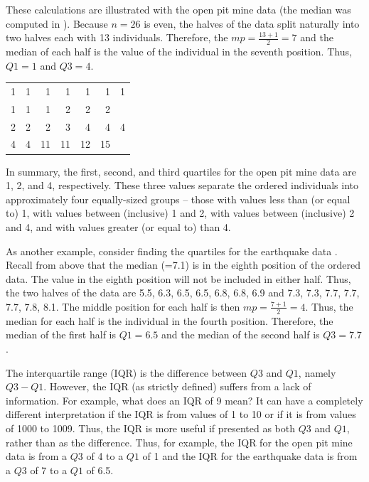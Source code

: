 \documentclass[10pt,openany]{book}\usepackage[]{graphicx}\usepackage[]{color}
\begin{document}
These calculations are illustrated with the open pit mine data (the median was computed in ). Because $n=26$ is even, the halves of the data split naturally into two halves each with 13 individuals. Therefore, the $mp=\frac{13+1}{2}=7$ and the median of each half is the value of the individual in the seventh position. Thus, $Q1=1$ and $Q3=4$.

\begin{tabular}{rrrrrrr}
  1 & 1 & 1 & 1 & 1 & 1 & 1 \\ 
  1 & 1 & 1 & 2 & 2 & 2 &  \\ 
  2 & 2 & 2 & 3 & 4 & 4 & 4 \\ 
  4 & 4 & 11 & 11 & 12 & 15 &  \\ 
  \end{tabular}


In summary, the first, second, and third quartiles for the open pit mine data are 1, 2, and 4, respectively. These three values separate the ordered individuals into approximately four equally-sized groups -- those with values less than (or equal to) 1, with values between (inclusive) 1 and 2, with values between (inclusive) 2 and 4, and with values greater (or equal to) than 4.

As another example, consider finding the quartiles for the earthquake data . Recall from above  that the median (=7.1) is in the eighth position of the ordered data. The value in the eighth position will not be included in either half. Thus, the two halves of the data are 5.5, 6.3, 6.5, 6.5, 6.8, 6.8, 6.9 and 7.3, 7.3, 7.7, 7.7, 7.7, 7.8, 8.1. The middle position for each half is then $mp=\frac{7+1}{2}=4$. Thus, the median for each half is the individual in the fourth position. Therefore, the median of the first half is $Q1=6.5$ and the median of the second half is $Q3=7.7$.

The interquartile range (IQR) is the difference between $Q3$ and $Q1$, namely $Q3-Q1$. However, the IQR (as strictly defined) suffers from a lack of information. For example, what does an IQR of 9 mean?  It can have a completely different interpretation if the IQR is from values of 1 to 10 or if it is from values of 1000 to 1009. Thus, the IQR is more useful if presented as both $Q3$ and $Q1$, rather than as the difference. Thus, for example, the IQR for the open pit mine data is from a $Q3$ of 4 to a $Q1$ of 1 and the IQR for the earthquake data is from a $Q3$ of 7 to a $Q1$ of 6.5.
\end{document}
